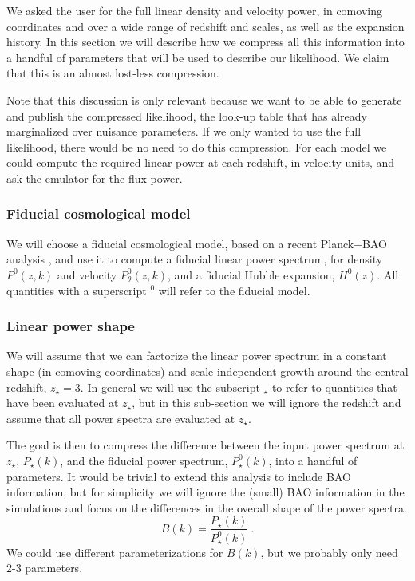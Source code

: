 We asked the user for the full linear density and velocity power, in
comoving coordinates and over a wide range of redshift and scales,
as well as the expansion history.
In this section we will describe how we compress all this information into
a handful of parameters that will be used to describe our likelihood.
We claim that this is an almost lost-less compression.

Note that this discussion is only relevant because we want to be able
to generate and publish the compressed likelihood, the look-up table that has
already marginalized over nuisance parameters.
If we only wanted to use the full likelihood, there would be no need to
do this compression.
For each model we could compute the required linear power at each redshift,
in velocity units, and ask the emulator for the flux power.

\subsubsection{Fiducial cosmological model}
 
We will choose a fiducial cosmological model, based on a recent Planck+BAO
analysis \cite{Planck2015}, and use it to compute a fiducial linear power
spectrum, for density $P^0(z,k)$ and velocity $P_\theta^0(z,k)$, and a
fiducial Hubble expansion, $H^0(z)$.
All quantities with a superscript $^0$ will refer to the fiducial model.

\subsubsection{Linear power shape}

We will assume that we can factorize the linear power spectrum in a 
constant shape (in comoving coordinates) and scale-independent growth 
around the central redshift, $z_\star=3$. 
In general we will use the subscript $_\star$ to refer to quantities that 
have been evaluated at $z_\star$, but in this sub-section we will ignore 
the redshift and assume that all power spectra are evaluated at $z_\star$.

The goal is then to compress the difference between the input power spectrum
at $z_\star$, $P_\star(k)$, and the fiducial power spectrum, $P_\star^0(k)$, 
into a handful of parameters.
It would be trivial to extend this analysis to include BAO information, but
for simplicity we will ignore the (small) BAO information in the simulations
and focus on the differences in the overall shape of the power spectra.
\begin{equation}
 B(k) = \frac{P_\star(k)}{P_\star^0(k)} ~. 
\end{equation}
We could use different parameterizations for $B(k)$, but we probably only
need 2-3 parameters.

